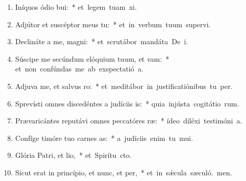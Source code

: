 \begin{flushleft}
\begin{enumerate}[leftmargin=*]

\item Iníquos ódio bui:~* \mbox{et legem tuam xi.}
\item Adjútor et suscéptor meus  tu:~* \mbox{et in verbum tuum supervi.}
\item Declináte a me, magni:~* \mbox{et scrutábor mandáta De i.}
\item Súscipe me secúndum elóquium tuum, et vam:~* \mbox{et non confúndas me ab exspectatió a.}
\item Adjuva me, et salvus ro:~* \mbox{et meditábor in justificatiónibus tu per.}
\item Sprevísti omnes discedéntes a judíciis is:~* \mbox{quia injústa cogitátio rum.}
\item Prævaricántes reputávi omnes peccatóres ræ:~* \mbox{ídeo diléxi testimóni a.}
\item Confíge timóre tuo carnes as:~* \mbox{a judíciis enim tu mui.}
\item Glória Patri, et lio,~* \mbox{et Spirítu cto.}
\item Sicut erat in princípio, et nunc, et per,~* \mbox{et in s\'{\ae}cula sæculó. men.}

\end{enumerate}
\end{flushleft}

